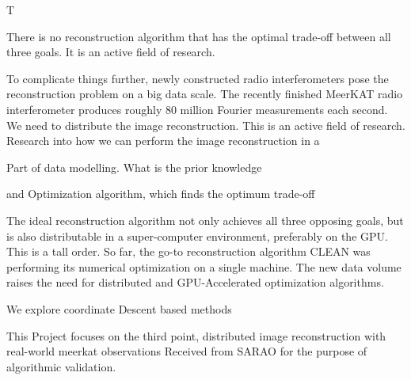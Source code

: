 T

There is no reconstruction algorithm that has the optimal trade-off between all three goals. It is an active field of research.

To complicate things further, newly constructed radio interferometers pose the reconstruction problem on a big data scale. The recently finished MeerKAT radio interferometer produces roughly 80 million Fourier measurements each second.
We need to distribute the image reconstruction. This is an active field of research.
Research into how we can perform the image reconstruction in a

Part of data modelling. What is the prior knowledge

and Optimization algorithm, which finds the optimum trade-off

The ideal reconstruction algorithm not only achieves all three opposing goals, but is also distributable in a super-computer environment, preferably on the GPU. This is a tall order. So far, the go-to reconstruction algorithm CLEAN was performing its numerical optimization on a single machine. The new data volume raises the need for distributed and GPU-Accelerated optimization algorithms.

We explore coordinate Descent based methods

This Project focuses on the third point, distributed image reconstruction with real-world meerkat observations
Received from SARAO for the purpose of algorithmic validation.
